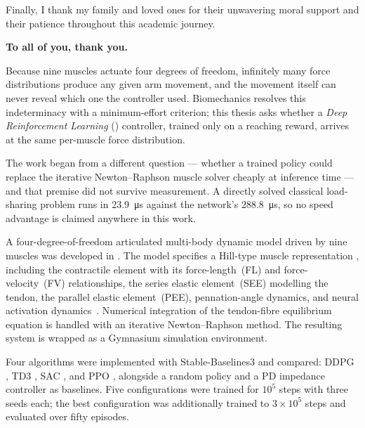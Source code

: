 Finally, I thank my family and loved ones for their unwavering moral support and their
patience throughout this academic journey.

\bigskip\noindent\hfill{\large\bfseries\color{black} To all of you, thank you.}


Because nine muscles actuate four degrees of freedom, infinitely many force
distributions produce any given arm movement, and the movement itself can never
reveal which one the controller used. Biomechanics resolves this indeterminacy
with a minimum-effort criterion; this thesis asks whether a \textit{Deep
Reinforcement Learning} (\DRL{}) controller, trained only on a reaching reward,
arrives at the same per-muscle force distribution.

The work began from a different question --- whether a trained policy could
replace the iterative Newton--Raphson muscle solver cheaply at inference time ---
and that premise did not survive measurement. A directly solved classical
load-sharing problem runs in \SI{23.9}{\micro\second} against the network's
\SI{288.8}{\micro\second}, so no speed advantage is claimed anywhere in this
work.

A four-degree-of-freedom articulated multi-body dynamic model driven by nine
muscles was developed in \MuJoCo{} \parencite{Todorov2012}. The model specifies a
Hill-type muscle representation \parencite{Hill1938, Zajac1989}, including the contractile element with
its force-length~(FL) and force-velocity~(FV) relationships, the series elastic
element~(SEE) modelling the tendon, the parallel elastic element~(PEE), pennation-angle
dynamics, and neural activation dynamics~\parencite{Thelen2003}. Numerical integration of
the tendon-fibre equilibrium equation is handled with an iterative Newton--Raphson
method. The resulting system is wrapped as a Gymnasium simulation environment.

Four \DRL{} algorithms were implemented with Stable-Baselines3
\parencite{Raffin2021} and compared: DDPG \parencite{Lillicrap2016}, TD3
\parencite{Fujimoto2018}, SAC \parencite{Haarnoja2018}, and PPO
\parencite{Schulman2017}, alongside a random policy and a PD impedance
controller as baselines. Five configurations were trained for $10^5$ steps with
three seeds each; the best configuration was additionally trained to
$3{\times}10^5$ steps and evaluated over fifty episodes.

